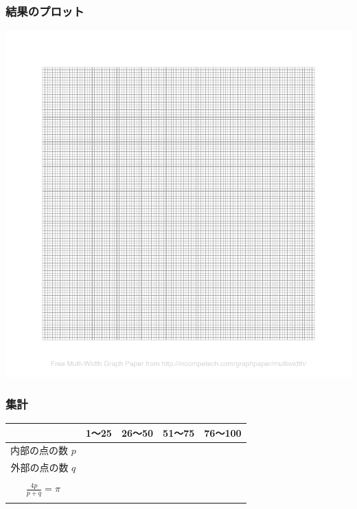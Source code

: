 \newpage

\subsubsection*{結果のプロット}

\hspace*{-\parindent}
\includegraphics[bb=33 32 365 362]{08_MonteCarlo/graph.pdf}

\subsubsection*{集計}

\hspace*{-\parindent}
\begin{tabular}{|c|c|c|c|c|}
\hline
& 1〜25 & 26〜50 & 51〜75 & 76〜100\\
\hline
内部の点の数 $p$ & & & & \\
\hline
外部の点の数 $q$ & & & & \\
\hline
 & \hspace*{2.5cm} & \hspace*{2.5cm} & \hspace*{2.5cm} & \hspace*{2.5cm}\\
\cline{2-5}
$\frac{4p}{p+q}=\pi$ & \multicolumn{2}{|c|}{} &  \multicolumn{2}{|c|}{} \\
\cline{2-5}
 & \multicolumn{4}{|c|}{} \\
\hline
\end{tabular}

